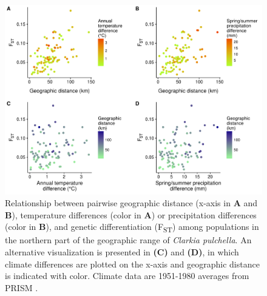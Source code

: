 \documentclass{article}
\begin{document}
\begin{figure}[ht]
\centering
\includegraphics[width=16cm]{figs/fst_clim_dist_north.pdf}
\caption[Pairwise differences and genetic differentiation among northern populations]{Relationship between pairwise geographic distance (x-axis in \textbf{A} and \textbf{B}), temperature differences (color in \textbf{A}) or precipitation differences (color in \textbf{B}), and genetic differentiation (F\textsubscript{ST}) among populations in the northern part of the geographic range of \textit{Clarkia pulchella}. An alternative visualization is presented in \textbf{(C)} and \textbf{(D)}, in which climate differences are plotted on the x-axis and geographic distance is indicated with color.  Climate data are 1951-1980 averages from PRISM \citep{PRISM}.}
\label{fst_north}
\end{figure}
\end{document}
